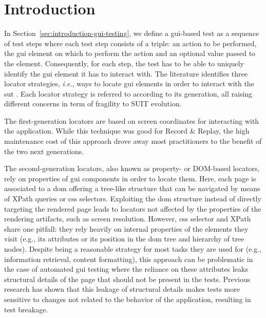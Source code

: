 \section{Introduction}
\label{sec:hpath-introduction}

In Section~\ref{sec:introduction-gui-testing}, we define a \gls{gui}-based test as a sequence of test steps where each test step consists of a triple: an action to be performed, the \gls{gui} element on which to perform the action and an optional value passed to the element. Consequently, for each step, the test has to be able to uniquely identify the \gls{gui} element it has to interact with. The literature identifies three locator strategies, \emph{i.e.}, ways to locate \gls{gui} elements in order to interact with the \gls{sut} \cite{Bosch2014, Leotta2018}. Each locator strategy is referred to according to its generation, all raising different concerns in term of fragility to SUIT evolution. 

The first-generation locators are based on screen coordinates for interacting with the application. While this technique was good for Record \& Replay, the high maintenance cost of this approach drove away most practitioners to the benefit of the two next generations.

The second-generation locators, also known as property- or DOM-based locators, rely on properties of \gls{gui} components in order to locate them. Here, each page is associated to a \gls{dom} offering a tree-like structure that can be navigated by means of XPath queries or \gls{css} selectors. Exploiting the \gls{dom} structure instead of directly targeting the rendered page leads to locators not affected by the properties of the rendering artifacts, such as screen resolution. However, \gls{css} selector and XPath share one pitfall: they rely heavily on internal properties of the elements they visit (e.g., its attributes or its position in the \gls{dom} tree and hierarchy of tree nodes). Despite being a reasonable strategy for most tasks they are used for (e.g., information retrieval, content formatting), this approach can be problematic in the case of automated \gls{gui} testing where the reliance on these attributes leaks structural details of the page that should not be present in the tests. Previous research \cite{Thummalapenta2013, Hammoudi2016} has shown that this leakage of structural details makes tests more sensitive to changes not related to the behavior of the application, resulting in test breakage.


